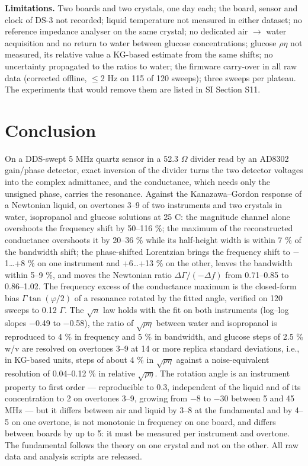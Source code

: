 \documentclass[11pt,a4paper]{article}
\begin{document}
\textbf{Limitations.} Two boards and two crystals, one day each; the board, sensor and clock of DS-3 not recorded; liquid temperature not measured in either dataset; no reference impedance analyser on the same crystal; no dedicated air $\rightarrow$ water acquisition and no return to water between glucose concentrations; glucose $\rho\eta$ not measured, its relative value a KG-based estimate from the same shifts; no uncertainty propagated to the ratios to water; the firmware carry-over in all raw data (corrected offline, $\le$2 Hz on 115 of 120 sweeps); three sweeps per plateau. The experiments that would remove them are listed in SI Section S11.

\section{Conclusion}

On a DDS-swept 5 MHz quartz sensor in a 52.3 $\Omega$ divider read by an AD8302 gain/phase detector, exact inversion of the divider turns the two detector voltages into the complex admittance, and the conductance, which needs only the unsigned phase, carries the resonance. Against the Kanazawa--Gordon response of a Newtonian liquid, on overtones 3--9 of two instruments and two crystals in water, isopropanol and glucose solutions at 25 \textdegree{}C: the magnitude channel alone overshoots the frequency shift by 50--116 \%; the maximum of the reconstructed conductance overshoots it by 20--36 \% while its half-height width is within 7 \% of the bandwidth shift; the phase-shifted Lorentzian brings the frequency shift to $-$1\ldots{}+8 \% on one instrument and +6\ldots{}+13 \% on the other, leaves the bandwidth within 5--9 \%, and moves the Newtonian ratio $\Delta\Gamma/(-\Delta f)$ from 0.71--0.85 to 0.86--1.02. The frequency excess of the conductance maximum is the closed-form bias $\Gamma\tan(\varphi/2)$ of a resonance rotated by the fitted angle, verified on 120 sweeps to 0.12 $\Gamma$. The $\sqrt n$ law holds with the fit on both instruments (log--log slopes $-$0.49 to $-$0.58), the ratio of $\sqrt{\rho\eta}$ between water and isopropanol is reproduced to 4 \% in frequency and 5 \% in bandwidth, and glucose steps of 2.5 \% w/v are resolved on overtones 3--9 at 14 or more replica standard deviations, i.e., in KG-based units, steps of about 4 \% in $\sqrt{\rho\eta}$ against a noise-equivalent resolution of 0.04--0.12 \% in relative $\sqrt{\rho\eta}$. The rotation angle is an instrument property to first order --- reproducible to 0.3\textdegree{}, independent of the liquid and of its concentration to 2\textdegree{} on overtones 3--9, growing from $-$8\textdegree{} to $-$30\textdegree{} between 5 and 45 MHz --- but it differs between air and liquid by 3--8\textdegree{} at the fundamental and by 4--5\textdegree{} on one overtone, is not monotonic in frequency on one board, and differs between boards by up to 5\textdegree{}: it must be measured per instrument and overtone. The fundamental follows the theory on one crystal and not on the other. All raw data and analysis scripts are released.
\end{document}
